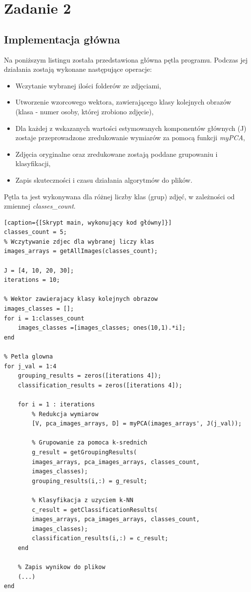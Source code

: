 \section{Zadanie 2}

\subsection{Implementacja główna}

Na poniższym listingu została przedstawiona główna pętla programu. Podczas jej działania zostają wykonane następujące operacje:
\begin{itemize}
	\item Wczytanie wybranej ilości folderów ze zdjęciami,
	\item Utworzenie wzorcowego wektora, zawierającego klasy kolejnych obrazów (klasa - numer osoby, której zrobiono zdjęcie), 
	\item Dla każdej z wskazanych wartości estymowanych komponentów głównych (J) zostaje przeprowadzone zredukowanie wymiarów za pomocą funkcji \textit{myPCA},
	\item Zdjęcia oryginalne oraz zredukowane zostają poddane grupowaniu i klasyfikacji,
	\item Zapis skuteczności i czasu działania algorytmów do plików.
\end{itemize}

Pętla ta jest wykonywana dla różnej liczby klas (grup) zdjęć, w zależności od zmiennej \textit{classes\_count}.

\vspace{5mm}

\begin{lstlisting}[linewidth=16.0cm][caption={[Skrypt main, wykonujący kod główny]}]
classes_count = 5;
% Wczytywanie zdjec dla wybranej liczy klas
images_arrays = getAllImages(classes_count);
	
J = [4, 10, 20, 30];
iterations = 10;
	
% Wektor zawierajacy klasy kolejnych obrazow
images_classes = [];
for i = 1:classes_count
	images_classes =[images_classes; ones(10,1).*i];
end
	
% Petla glowna
for j_val = 1:4
	grouping_results = zeros([iterations 4]);
	classification_results = zeros([iterations 4]);
	
	for i = 1 : iterations
		% Redukcja wymiarow
		[V, pca_images_arrays, D] = myPCA(images_arrays', J(j_val));
		
		% Grupowanie za pomoca k-srednich
		g_result = getGroupingResults(
		images_arrays, pca_images_arrays, classes_count, 
		images_classes);
		grouping_results(i,:) = g_result;
		
		% Klasyfikacja z uzyciem k-NN
		c_result = getClassificationResults(
		images_arrays, pca_images_arrays, classes_count, 
		images_classes);
		classification_results(i,:) = c_result;
	end
	
	% Zapis wynikow do plikow
	(...)
end
\end{lstlisting}

